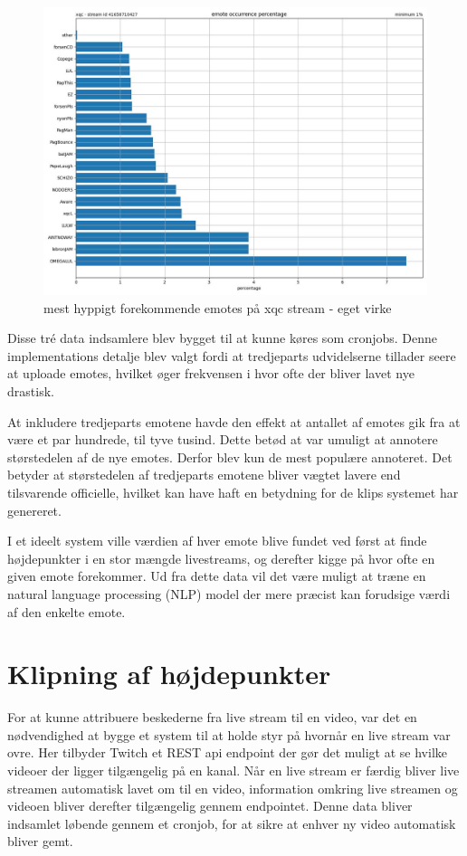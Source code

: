 \documentclass{article}
\begin{document}
\begin{figure}[hp]
\centering
\includegraphics[width=\textwidth]{emote-occurence-xqc-41658710427.jpg}
\caption{mest hyppigt forekommende emotes på xqc stream - eget virke}
\end{figure}

Disse tré data indsamlere blev bygget til at kunne køres som cronjobs. Denne implementations detalje blev valgt fordi at tredjeparts udvidelserne tillader seere at uploade emotes, hvilket øger frekvensen i hvor ofte der bliver lavet nye drastisk.

At inkludere tredjeparts emotene havde den effekt at antallet af emotes gik fra at være et par hundrede, til tyve tusind. Dette betød at var umuligt at annotere størstedelen af de nye emotes. Derfor blev kun de mest populære annoteret. Det betyder at størstedelen af tredjeparts emotene bliver vægtet lavere end tilsvarende officielle, hvilket kan have haft en betydning for de klips systemet har genereret.

I et ideelt system ville værdien af hver emote blive fundet ved først at finde højdepunkter i en stor mængde livestreams, og derefter kigge på hvor ofte en given emote forekommer. Ud fra dette data vil det være muligt at træne en natural language processing (NLP) model der mere præcist kan forudsige værdi af den enkelte emote.

\section{Klipning af højdepunkter}
For at kunne attribuere beskederne fra live stream til en video, var det en nødvendighed at bygge et system til at holde styr på hvornår en live stream var ovre. Her tilbyder Twitch et REST api endpoint der gør det muligt at se hvilke videoer der ligger tilgængelig på en kanal. Når en live stream er færdig bliver live streamen automatisk lavet om til en video, information omkring live streamen og videoen bliver derefter tilgængelig gennem endpointet. Denne data bliver indsamlet løbende gennem et cronjob, for at sikre at enhver ny video automatisk bliver gemt.
\end{document}
